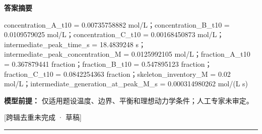 \documentclass[UTF8,11pt,a4paper]{ctexart}
\begin{document}
\noindent\textbf{答案摘要}\par
concentration\_A\_t10 = 0.00735758882 mol/L；concentration\_B\_t10 = 0.0109579025 mol/L；concentration\_C\_t10 = 0.00168450873 mol/L；intermediate\_peak\_time\_s = 18.4839248 s；intermediate\_peak\_concentration\_M = 0.0125992105 mol/L；fraction\_A\_t10 = 0.367879441 fraction；fraction\_B\_t10 = 0.547895123 fraction；fraction\_C\_t10 = 0.0842254363 fraction；skeleton\_inventory\_M = 0.02 mol/L；intermediate\_generation\_at\_peak\_M\_s = 0.000314980262 mol/(L s)\par
\noindent\textbf{模型前提：}
仅适用题设温度、边界、平衡和理想动力学条件；人工专家未审定。\par
\noindent\textcolor{red!65!black}{[跨辑去重未完成 · 草稿]} \par
\medskip\hrule\medskip
{}
\end{document}
